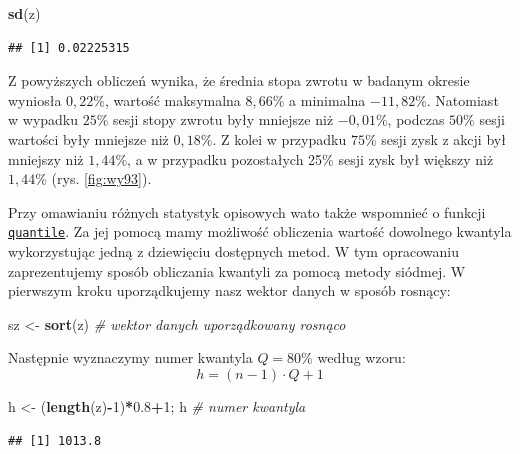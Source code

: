 \documentclass[polish,]{book}
\newenvironment{Shaded}{\begin{snugshade}}{\end{snugshade}}
\newcommand{\CommentTok}[1]{\textcolor[rgb]{0.56,0.35,0.01}{\textit{#1}}}
\newcommand{\DecValTok}[1]{\textcolor[rgb]{0.00,0.00,0.81}{#1}}
\newcommand{\FloatTok}[1]{\textcolor[rgb]{0.00,0.00,0.81}{#1}}
\newcommand{\KeywordTok}[1]{\textcolor[rgb]{0.13,0.29,0.53}{\textbf{#1}}}
\newcommand{\NormalTok}[1]{#1}
\newcommand{\OperatorTok}[1]{\textcolor[rgb]{0.81,0.36,0.00}{\textbf{#1}}}
\newcommand{\StringTok}[1]{\textcolor[rgb]{0.31,0.60,0.02}{#1}}
\begin{document}
\begin{Shaded}
\begin{Highlighting}[]
\KeywordTok{sd}\NormalTok{(z)}
\end{Highlighting}
\end{Shaded}

\begin{verbatim}
## [1] 0.02225315
\end{verbatim}

Z powyższych obliczeń wynika, że średnia stopa zwrotu w badanym okresie wyniosła
\(0,22\%\), wartość maksymalna \(8,66\%\) a minimalna \(-11,82\%\). Natomiast w wypadku \(25\%\) sesji
stopy zwrotu były mniejsze niż \(-0,01\%\), podczas \(50\%\) sesji wartości były mniejsze
niż \(0,18\%\). Z kolei w przypadku \(75\%\) sesji zysk z akcji był mniejszy niż \(1,44\%\), a w
przypadku pozostałych 25\% sesji zysk był większy niż \(1,44\%\) (rys. \ref{fig:wy93}).

Przy omawianiu różnych statystyk opisowych wato także wspomnieć o funkcji
\href{https://rdrr.io/r/stats/quantile.html}{\texttt{quantile}}. Za jej pomocą mamy możliwość obliczenia wartość dowolnego kwantyla wykorzystując jedną z dziewięciu dostępnych metod. W
tym opracowaniu zaprezentujemy sposób obliczania kwantyli za pomocą metody
siódmej. W pierwszym kroku uporządkujemy nasz wektor danych w sposób rosnący:

\begin{Shaded}
\begin{Highlighting}[]
\NormalTok{sz <-}\StringTok{ }\KeywordTok{sort}\NormalTok{(z) }\CommentTok{# wektor danych uporządkowany rosnąco}
\end{Highlighting}
\end{Shaded}

Następnie wyznaczymy numer kwantyla \(Q = 80\%\) według wzoru:
\begin{equation}
h=(n-1)\cdot Q+1
\label{eq:wz93}
\end{equation}

\begin{Shaded}
\begin{Highlighting}[]
\NormalTok{h <-}\StringTok{ }\NormalTok{(}\KeywordTok{length}\NormalTok{(z)}\OperatorTok{-}\DecValTok{1}\NormalTok{)}\OperatorTok{*}\FloatTok{0.8}\OperatorTok{+}\DecValTok{1}\NormalTok{; h }\CommentTok{# numer kwantyla}
\end{Highlighting}
\end{Shaded}

\begin{verbatim}
## [1] 1013.8
\end{verbatim}
\end{document}
